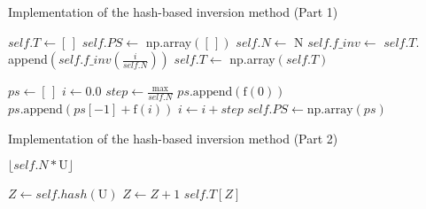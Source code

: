 
\begin{algorithm}
    \caption{Implementation of the hash-based inversion method (Part 1)}
    \label{alg:inv_hash}
    \begin{algorithmic}
        
        \Input
        \EndInput
            \State $self.T \gets [\,]$ 
            \State $self.PS \gets$ np.array$([\,])$ 
            \State $self.N \gets$ N
            \State $self.f\_inv \gets$
                \State $self.T.$append$(self.f\_inv(\frac{i}{self.N}))$
            \EndFor
            \State $self.T \gets$ np.array$(self.T)$
        \EndFunction
        \State
        
        \Input
        \EndInput
            \State $ps \gets [\,]$
            \State $i \gets 0.0$
            \State $step \gets \frac{\textrm{max}}{self.N}$
                    \State $ps.\textrm{append}(\textrm{f}(0))$
                \Else
                    \State $ps.\textrm{append}(ps[-1] + \textrm{f}(i))$
                \EndIf
                \State $i \gets i + step$
            \EndWhile
            \State $self.PS \gets \textrm{np.array}(ps)$
        \EndFunction
        \State

    \end{algorithmic}
\end{algorithm}

\begin{algorithm}
    \caption{Implementation of the hash-based inversion method (Part 2)}
    \begin{algorithmic}
        \Input
        \EndInput
        \Output
        \EndOutput
            \State\Return $\lfloor self.N * \textrm{U} \rfloor$
        \EndFunction
        \State


        \Input
        \EndInput
        \Output
        \EndOutput
            \State $Z \gets self.hash(\textrm{U})$
                $Z \gets Z + 1$
            \EndWhile
            \State\Return $self.T[Z]$
        \EndFunction
    \end{algorithmic}
\end{algorithm}

